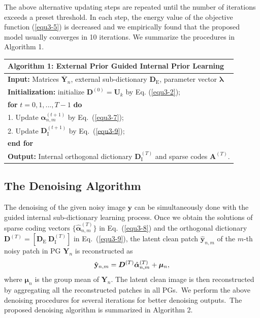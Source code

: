 The above alternative updating steps are repeated until the number of iterations exceeds a preset threshold. In each step, the energy value of the objective function (\ref{equ3-5}) is decreased and we empirically found that the proposed model usually converges in 10 iterations. We summarize the procedures in Algorithm 1.


\begin{table}\label{alg3-1}\vspace{3mm}
\begin{tabular}{l}
\hline
\textbf{Algorithm 1}: External Prior Guided Internal Prior Learning
\\
\hline
\textbf{Input:} Matrices $\bm{\overline{Y}}_{n}$, external sub-dictionary $\bm{D}_{\text{E}}$, parameter vector $\bm{\lambda}$
\\
\textbf{Initialization:} initialize $\bm{D}^{(0)}=\bm{U}_{k}$ by Eq. (\ref{equ3-2});
\\
\textbf{for} $t=0,1, ...,T-1$ \textbf{do}
\\
1. Update $\bm{\alpha}_{n,m}^{(t+1)}$ by Eq.\ (\ref{equ3-7});
\\
2. Update $\bm{D}_{\text{I}}^{(t+1)}$ by Eq.\ (\ref{equ3-9});
\\
\textbf{end for}
\\
\textbf{Output:} Internal orthogonal dictionary $\bm{D}_{\text{I}}^{(T)}$ and sparse codes $\textbf{A}^{(T)}$.
\\
\hline
\end{tabular}
\end{table}



\subsection{The Denoising Algorithm}

The denoising of the given noisy image $\mathbf{y}$ can be simultaneously done with the guided internal sub-dictionary learning process. Once we obtain the solutions of sparse coding vectors $\{\hat{\bm{\alpha}}_{n,m}^{(T)}\}$ in Eq.\ (\ref{equ3-8}) and the orthogonal dictionary $\bm{D}^{(T)} = [\bm{D}_{\text{E}}\ \bm{D}_{\text{I}}^{(T)}]$ in Eq.\ (\ref{equ3-9}), the latent clean patch $\hat{\mathbf{y}}_{n,m}$ of the $m$-th noisy patch in PG $\bm{Y}_{n}$ is reconstructed as
\vspace{-2mm}
\begin{equation}\label{equ3-13}
\vspace{-2mm}
\hat{\mathbf{y}}_{n,m}=\bm{D}^{(T)}\hat{\bm{\alpha}}_{n,m}^{(T)}+\bm{\mu}_{n},
\end{equation}
where $\bm{\mu}_{n}$ is the group mean of $\bm{Y}_{n}$. The latent clean image is then reconstructed by aggregating all the reconstructed patches in all PGs.\ We perform the above denoising procedures for several iterations for better denoising outputs.\ The proposed denoising algorithm is summarized in Algorithm 2.

